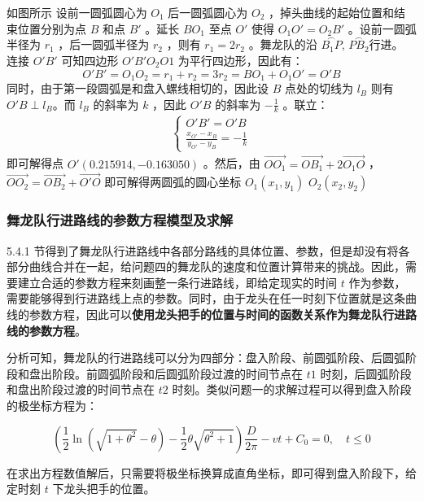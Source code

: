 \documentclass[a4paper]{article}
\begin{document}
		如图所示 %
		设前一圆弧圆心为 $O_1$ 后一圆弧圆心为 $O_2$ ，掉头曲线的起始位置和结束位置分别为点 $B$ 和点 $B'$ 。延长 $B O_1$ 至点 $O'$ 使得 $O_1O' = O_2B'$ 。设前一圆弧半径为 $r_1$ ，后一圆弧半径为 $r_2$ ，则有 $r_1 = 2r_2$ 。舞龙队的沿 $\overset{\frown}{B_1 P}$, $\overset{\frown}{PB_2}$行进。 连接 $O'B'$ 可知四边形 $O'B'O_2O1$ 为平行四边形，因此有：
		$$ O'B'= O_1O_2 = r_1 + r_2 = 3r_2 = BO_1 + O_1O' = O'B$$
		同时，由于第一段圆弧是和盘入螺线相切的，因此设 $B$ 点处的切线为 $l_B$ 则有 $O'B \perp l_B$。而 $l_B$ 的斜率为 $k$ ，因此 $O'B$ 的斜率为 $-\frac{1}{k}$ 。联立：
		\begin{align}
			\left\{
			\begin{aligned}
				O'B'=O'B \\
				\frac{x_{O'} - x_B}{y_{O'} - y_B} = -\frac{1}{k}
			\end{aligned}
			\right.
		\end{align}
		即可解得点 $O'(0.215914, -0.163050)$ 。然后，由 $\overrightarrow{OO_1} = \overrightarrow{OB_1} + 2\overrightarrow{O_1O}$ ， $\overrightarrow{OO_2} = \overrightarrow{OB_2} + \overrightarrow{O'O}$ 即可解得两圆弧的圆心坐标 $O_1(x_1, y_1)$ $O_2(x_2, y_2)$

	\subsubsection{舞龙队行进路线的参数方程模型及求解}
	
		5.4.1 节得到了舞龙队行进路线中各部分路线的具体位置、参数，但是却没有将各部分曲线合并在一起，给问题四的舞龙队的速度和位置计算带来的挑战。因此，需要建立合适的参数方程来刻画整一条行进路线，即给定现实的时间 $t$ 作为参数，需要能够得到行进路线上点的参数。同时，由于龙头在任一时刻下位置就是这条曲线的参数方程，因此可以\textbf{使用龙头把手的位置与时间的函数关系作为舞龙队行进路线的参数方程}。
		
		分析可知，舞龙队的行进路线可以分为四部分：盘入阶段、前圆弧阶段、后圆弧阶段和盘出阶段。前圆弧阶段和后圆弧阶段过渡的时间节点在 $t1$ 时刻，后圆弧阶段和盘出阶段过渡的时间节点在 $t2$ 时刻。类似问题一的求解过程可以得到盘入阶段的极坐标方程为：
		
		\begin{equation}
			(\frac{1}{2}\ln(\sqrt{1 + \theta^2} - \theta) - \frac{1}{2} \theta \sqrt{\theta^2 + 1}) \frac{D}{2 \pi} - vt + C_0 = 0, \quad t \le 0
		\end{equation}
		
		在求出方程数值解后，只需要将极坐标换算成直角坐标，即可得到盘入阶段下，给定时刻 $t$ 下龙头把手的位置。
		
\end{document}
